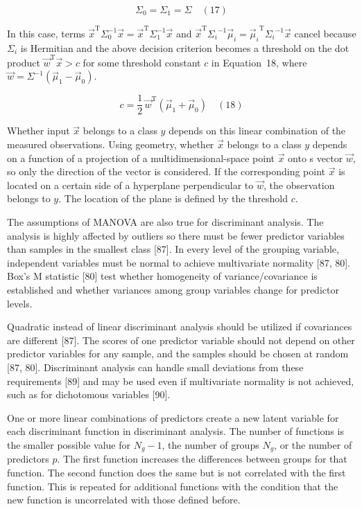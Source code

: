 \documentclass[preprint,12pt]{elsarticle}
\begin{document}
\begin{equation}
	\Sigma_{0}=\Sigma_{1}=\Sigma
	\quad\left(17\right)
\end{equation}

In this case, terms ${\vec{x}}^{\mathrm{T}}\Sigma_{0}^{-1}{\vec{x}}={\vec{x}}^{\mathrm{T}}\Sigma_{1}^{-1}{\vec{x}}$ and ${\vec{x}}^{\mathrm{T}}{\Sigma_{i}}^{-1}{\vec{\mu}}_{i}={{\vec{\mu}}_{i}}^{\mathrm{T}}{\Sigma_{i}}^{-1}{\vec{x}}$ cancel because $\Sigma_{i}$ is Hermitian and the above decision criterion becomes a threshold on the dot product ${\vec{w}}^{\mathrm{T}}{\vec{x}}>c$ for some threshold constant $c$ in Equation~18, where ${\vec{w}}=\Sigma ^{-1}({\vec{\mu}}_{1}-{\vec{\mu}}_{0})$.

\begin{equation}
	c={\frac{1}{2}}\,{\vec{w}}^{\mathrm{T}}({\vec{\mu}}_{1}+{\vec{\mu}}_{0})
	\quad\left(18\right)
\end{equation}

Whether input $\vec{x}$ belongs to a class $y$ depends on this linear combination of the measured observations. Using geometry, whether $\vec{x}$ belongs to a class $y$ depends on a function of a projection of a multidimensional-space point $\vec{x}$ onto s vector $\vec{w}$, so only the direction of the vector is considered. If the corresponding point $\vec{x}$ is located on a certain side of a hyperplane perpendicular to $\vec{w}$, the observation belongs to $y$. The location of the plane is defined by the threshold $c$.

The assumptions of MANOVA are also true for discriminant analysis. The analysis is highly affected by outliers so there must be fewer predictor variables than samples in the smallest class [87]. In every level of the grouping variable, independent variables must be normal to achieve multivariate normality [87, 80]. Box's M statistic [80] test whether homogeneity of variance/covariance is established and whether variances among group variables change for predictor levels. 

Quadratic instead of linear discriminant analysis should be utilized if covariances are different [87]. The scores of one predictor variable should not depend on other predictor variables for any sample, and the samples should be chosen at random [87, 80]. Discriminant analysis can handle small deviations from these requirements [89] and may be used even if multivariate normality is not achieved, such as for dichotomous variables [90].

One or more linear combinations of predictors create a new latent variable for each discriminant function in discriminant analysis. The number of functions is the smaller possible value for $N_{g}-1$, the number of groups $N_{g}$, or the number of predictors $p$. The first function increases the differences between groups for that function. The second function does the same but is not correlated with the first function. This is repeated for additional functions with the condition that the new function is uncorrelated with those defined before.
\end{document}
